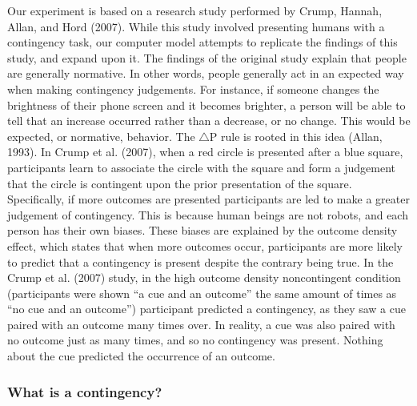 \documentclass[
  english,
  man,floatsintext]{apa6}
\begin{document}
Our experiment is based on a research study performed by Crump, Hannah, Allan, and Hord (2007). While this study involved presenting humans with a contingency task, our computer model attempts to replicate the findings of this study, and expand upon it. The findings of the original study explain that people are generally normative. In other words, people generally act in an expected way when making contingency judgements. For instance, if someone changes the brightness of their phone screen and it becomes brighter, a person will be able to tell that an increase occurred rather than a decrease, or no change. This would be expected, or normative, behavior. The \(\triangle\)P rule is rooted in this idea (Allan, 1993). In Crump et al. (2007), when a red circle is presented after a blue square, participants learn to associate the circle with the square and form a judgement that the circle is contingent upon the prior presentation of the square. Specifically, if more outcomes are presented participants are led to make a greater judgement of contingency. This is because human beings are not robots, and each person has their own biases. These biases are explained by the outcome density effect, which states that when more outcomes occur, participants are more likely to predict that a contingency is present despite the contrary being true. In the Crump et al. (2007) study, in the high outcome density noncontingent condition (participants were shown \enquote{a cue and an outcome} the same amount of times as \enquote{no cue and an outcome}) participant predicted a contingency, as they saw a cue paired with an outcome many times over. In reality, a cue was also paired with no outcome just as many times, and so no contingency was present. Nothing about the cue predicted the occurrence of an outcome.

\hypertarget{what-is-a-contingency}{%
\subsubsection{What is a contingency?}\label{what-is-a-contingency}}
\end{document}
